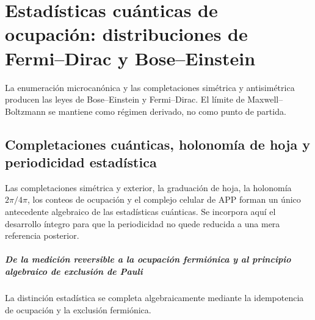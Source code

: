 \chapter{Estadísticas cuánticas de ocupación: distribuciones de Fermi–Dirac y Bose–Einstein}
\label{chap:parte-iv-55}

La enumeración microcanónica y las completaciones simétrica y antisimétrica producen las leyes de Bose--Einstein y Fermi--Dirac. El límite de Maxwell--Boltzmann se mantiene como régimen derivado, no como punto de partida.



\section{Completaciones cuánticas, holonomía de hoja y periodicidad estadística}

Las completaciones simétrica y exterior, la graduación de hoja, la holonomía
\(2\pi/4\pi\), los conteos de ocupación y el complejo celular de APP forman un
único antecedente algebraico de las estadísticas cuánticas. Se incorpora aquí
el desarrollo íntegro para que la periodicidad no quede reducida a una mera
referencia posterior.

\begingroup
\let\chapter\section
\let\section\subsection
\let\subsection\subsubsection
\let\subsubsection\paragraph
\let\clearpage\relax
\let\cleardoublepage\relax

\endgroup

\paragraph{De la medición reversible a la ocupación fermiónica y al principio algebraico de exclusión de Pauli} La distinción estadística se completa algebraicamente mediante la idempotencia de ocupación y la exclusión fermiónica.
